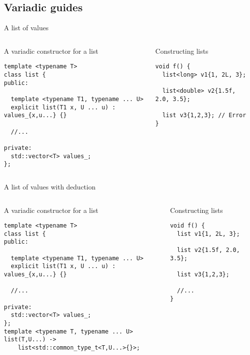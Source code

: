 \subsection{Variadic guides}

\begin{frame}[t,fragile]{A list of values}

\begin{columns}[T]

\begin{block}{A variadic constructor for a list}
\begin{lstlisting}
template <typename T>
class list {
public:

  template <typename T1, typename ... U>
  explicit list(T1 x, U ... u) : values_{x,u...} {}

  //...

private:
  std::vector<T> values_;
};
\end{lstlisting}
\end{block}

\pause
{}
\begin{block}{Constructing lists}
\begin{lstlisting}
void f() {
  list<long> v1{1, 2L, 3};

  list<double> v2{1.5f, 2.0, 3.5};

  list v3{1,2,3}; // Error
}
\end{lstlisting}
\end{block}

\end{columns}
\end{frame}

\begin{frame}[t,fragile]{A list of values with deduction}

\begin{columns}[T]

\begin{block}{A variadic constructor for a list}
\begin{lstlisting}[escapechar=@]
template <typename T>
class list {
public:

  template <typename T1, typename ... U>
  explicit list(T1 x, U ... u) : values_{x,u...} {}

  //...

private:
  std::vector<T> values_;
};
template <typename T, typename ... U>
list(T,U...) -> 
    list<std::common_type_t<T,U...>{}>;
\end{lstlisting}
\end{block}

\pause
{}
\begin{block}{Constructing lists}
\begin{lstlisting}
void f() {
  list v1{1, 2L, 3};

  list v2{1.5f, 2.0, 3.5};

  list v3{1,2,3};

  //...
}
\end{lstlisting}
\end{block}

\end{columns}
\end{frame}
